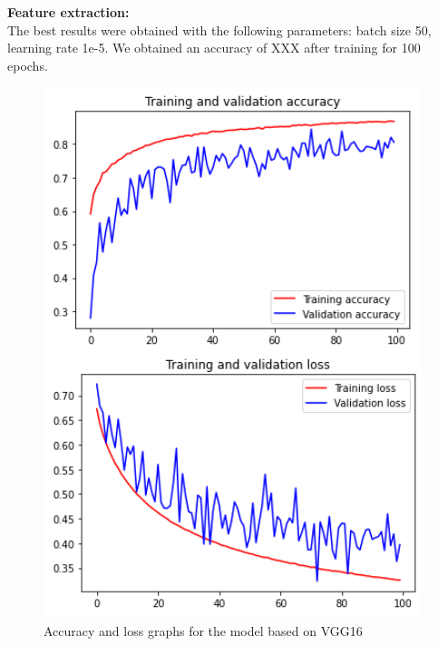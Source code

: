\documentclass[11pt,a4paper,oneside]{article}
\begin{document}
\textbf{Feature extraction:}\\
The best results were obtained with the following parameters: batch size 50, learning rate 1e-5. We obtained an accuracy of XXX after training for 100 epochs.

\begin{figure}[h]
\centering
	\begin{minipage}[c]{.4\textwidth}
		\centering\setlength{\captionmargin}{0pt}%
		\includegraphics[width=.9\textwidth]{images/Task 3/VGG16 3.1/Accuracy}
		\caption{Accuracy and loss graphs for the model based on VGG16}
		\label{fig:vgg16_3.1_accuracy}
	\end{minipage}
	\hspace{5mm}%
	\begin{minipage}[c]{.4\textwidth}
		\centering\setlength{\captionmargin}{0pt}%

\end{minipage}
\end{figure}
\end{document}
